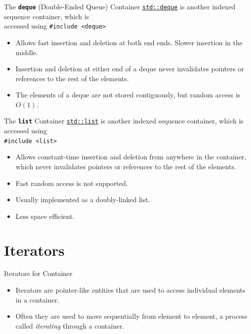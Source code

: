\documentclass[14pt,aspectratio=1610]{beamer}
\begin{document}
\begin{frame}[fragile]{The \texttt{\bfseries deque} (Double-Ended Queue) Container}
\href{https://en.cppreference.com/w/cpp/container/deque}{\lstinline{std::deque}} is another indexed sequence container, which is \\accessed using
\lstinline{#include <deque>}

\begin{itemize}
\item
  Allows fast insertion and deletion at both end ends. Slower insertion in the middle.
\item
  Insertion and deletion at either end of a deque never invalidates pointers or references to the rest of the elements.
\item
  The elements of a deque are not stored contiguously, but random access is $O(1)$.
\end{itemize}
\end{frame}

\begin{frame}[fragile]{The \texttt{\bfseries list}  Container}
\href{https://en.cppreference.com/w/cpp/container/list}{\lstinline{std::list}} is another indexed sequence container, which is accessed using\\
\lstinline{#include <list>}

\begin{itemize}
\item
  Allows constant-time insertion and deletion from anywhere in the container, which never invalidates pointers or references to the rest of the elements.
\item
  Fast random access is not supported.
\item
  Usually implemented as a doubly-linked list.
\item
  Less space efficient.
\end{itemize}
\end{frame}

\section{Iterators}

\begin{frame}{Iterators for Container}
\begin{itemize}
\item
  Iterators are pointer-like entities that are used to access individual elements in a container.
\item
  Often they are used to move sequentially from element to element, a process called \textit{iterating} through a container.
\end{itemize}
\end{frame}
\end{document}
